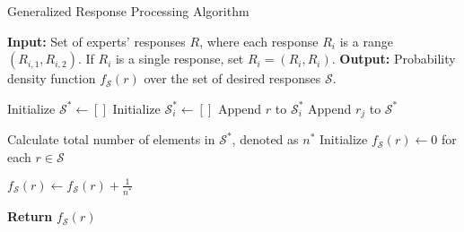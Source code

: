 \begin{algorithm}
\caption{Generalized Response Processing Algorithm}
\begin{algorithmic}[1]
\State \textbf{Input:} Set of experts' responses $R$, where each response $R_i$ is a range $(R_{i,1}, R_{i,2})$. If $R_i$ is a single response, set $R_i = (R_i, R_i)$.
\State \textbf{Output:} Probability density function $f_{\mathcal{S}}(r)$ over the set of desired responses $\mathcal{S}$.

\State Initialize $\mathcal{S}^* \gets []$ 
    \State Initialize $\mathcal{S}_i^* \gets []$ 
            \State Append $r$ to $\mathcal{S}_i^*$
        \EndIf
    \EndFor
        \State Append $r_j$ to $\mathcal{S}^*$
    \EndFor
\EndFor

\State Calculate total number of elements in $\mathcal{S}^*$, denoted as $n^*$
\State Initialize $f_{\mathcal{S}}(r) \gets 0$ for each $r \in \mathcal{S}$

    \State $f_{\mathcal{S}}(r) \gets f_{\mathcal{S}}(r) + \frac{1}{n^*}$ 
\EndFor

\State \textbf{Return} $f_{\mathcal{S}}(r)$
\end{algorithmic}
\end{algorithm}

